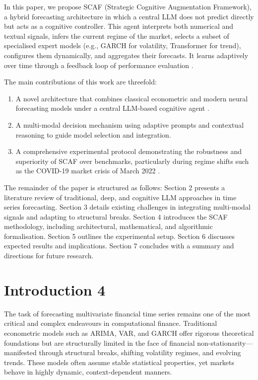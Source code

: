 \documentclass[conference]{IEEEtran}
\begin{document}
In this paper, we propose SCAF (Strategic Cognitive Augmentation Framework), a hybrid forecasting architecture in which a central LLM does not predict directly but acts as a cognitive controller. This agent interprets both numerical and textual signals, infers the current regime of the market, selects a subset of specialised expert models (e.g., GARCH for volatility, Transformer for trend), configures them dynamically, and aggregates their forecasts. It learns adaptively over time through a feedback loop of performance evaluation \cite{zhao2023mtgnn, lin2023timesnet}.

The main contributions of this work are threefold:
\begin{enumerate}
    \item A novel architecture that combines classical econometric and modern neural forecasting models under a central LLM-based cognitive agent \cite{vaswani2017transformer}.
    \item A multi-modal decision mechanism using adaptive prompts and contextual reasoning to guide model selection and integration.
    \item A comprehensive experimental protocol demonstrating the robustness and superiority of SCAF over benchmarks, particularly during regime shifts such as the COVID-19 market crisis of March 2022 \cite{wang2024deepreview, fan2025hybrid}.
\end{enumerate}

The remainder of the paper is structured as follows: Section 2 presents a literature review of traditional, deep, and cognitive LLM approaches in time series forecasting. Section 3 details existing challenges in integrating multi-modal signals and adapting to structural breaks. Section 4 introduces the SCAF methodology, including architectural, mathematical, and algorithmic formalisation. Section 5 outlines the experimental setup. Section 6 discusses expected results and implications. Section 7 concludes with a summary and directions for future research.


\section{Introduction 4}

The task of forecasting multivariate financial time series remains one of the most critical and complex endeavours in computational finance. Traditional econometric models such as ARIMA, VAR, and GARCH offer rigorous theoretical foundations but are structurally limited in the face of financial non-stationarity—manifested through structural breaks, shifting volatility regimes, and evolving trends. These models often assume stable statistical properties, yet markets behave in highly dynamic, context-dependent manners.
\end{document}
